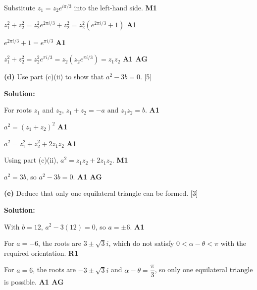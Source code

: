 \documentclass[12pt, twoside]{article}
\begin{document}
\begin{enumerate}[itemsep=0.3cm]
Substitute $z_1 = z_2e^{i\pi/3}$ into the left-hand side. \hfill \textbf{M1}

$z_1^2 + z_2^2 = z_2^2e^{2\pi i/3} + z_2^2
= z_2^2(e^{2\pi i/3} + 1)$ \hfill \textbf{A1}

$e^{2\pi i/3} + 1 = e^{\pi i/3}$ \hfill \textbf{A1}

$z_1^2 + z_2^2 = z_2^2e^{\pi i/3} = z_2(z_2e^{\pi i/3}) = z_1z_2$ \hfill \textbf{A1 AG}

\medskip

\textbf{(d)} Use part (c)(ii) to show that $a^2 - 3b = 0$. \hfill [5]

\textbf{Solution:}

For roots $z_1$ and $z_2$, $z_1 + z_2 = -a$ and $z_1z_2 = b$. \hfill \textbf{A1}

$a^2 = (z_1 + z_2)^2$ \hfill \textbf{A1}

$a^2 = z_1^2 + z_2^2 + 2z_1z_2$ \hfill \textbf{A1}

Using part (c)(ii), $a^2 = z_1z_2 + 2z_1z_2$. \hfill \textbf{M1}

$a^2 = 3b$, so $a^2 - 3b = 0$. \hfill \textbf{A1 AG}

\medskip

\textbf{(e)} Deduce that only one equilateral triangle can be formed. \hfill [3]

\textbf{Solution:}

With $b = 12$, $a^2 - 3(12) = 0$, so $a = \pm 6$. \hfill \textbf{A1}

For $a = -6$, the roots are $3 \pm \sqrt{3}i$, which do not satisfy
$0 < \alpha-\theta < \pi$ with the required orientation. \hfill \textbf{R1}

For $a = 6$, the roots are $-3 \pm \sqrt{3}i$ and
$\alpha-\theta = \dfrac{\pi}{3}$, so only one equilateral triangle is possible. \hfill \textbf{A1 AG}

\end{enumerate}
\end{document}
